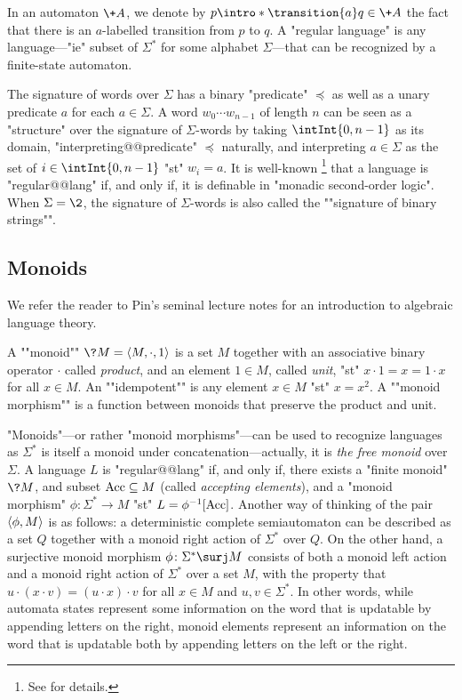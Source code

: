 In an automaton $\+A$, we denote by \AP $p \intro*\transition{a} q \in \+A$
the fact that there is an $a$-labelled transition from $p$ to $q$.
A "regular language" is any language---"ie" subset of $\Sigma^*$ for some alphabet $\Sigma$---that
can be recognized by a finite-state automaton.

The signature of words over $\Sigma$ has a binary "predicate" $\preceq$
as well as a unary predicate $a$ for each $a\in \Sigma$.
A word $w_0 \cdots w_{n-1}$ of length $n$
can be seen as a "structure" over the signature of $\Sigma$-words
by taking $\intInt{0,n-1}$ as its domain, "interpreting@@predicate"
$\preceq$ naturally, and interpreting $a\in \Sigma$
as the set of $i \in \intInt{0,n-1}$ "st" $w_i = a$.
It is well-known%
\footnote{See  for details.}
that a language is "regular@@lang" if, and only if, it is definable in "monadic second-order logic".
When $\Sigma = \2$, the signature of $\Sigma$-words is also called 
the \AP""signature of binary strings"".

\subsection{Monoids}

We refer the reader to Pin's seminal lecture notes \cite{Pin2022MathematicalFoundations}
for an introduction to algebraic language theory.

A \AP""monoid"" $\?M = \tup{M,{\cdot},1}$ is a set $M$ together with an associative binary operator $\cdot$ called \emph{product}, and an element $1 \in M$, called \emph{unit}, "st" $x\cdot 1 = x = 1 \cdot x$ for all $x\in M$. An \AP""idempotent"" is any element $x\in M$ "st" $x = x^2$.
A \AP""monoid morphism"" is a function between monoids that preserve the product and unit.

"Monoids"---or rather "monoid morphisms"---can be used to recognize languages as $\Sigma^*$
is itself a monoid under concatenation---actually, it is \emph{the free monoid} over $\Sigma$.
A language $L$ is "regular@@lang" if, and only if, there exists a "finite monoid" $\?M$,
and subset $\textrm{Acc} \subseteq M$ (called \emph{accepting elements}), and a "monoid morphism"
$\phi\colon \Sigma^* \to M$ "st" $L = \phi^{-1}[\textrm{Acc}]$.
Another way of thinking of the pair $\langle\phi, M\rangle$ is as follows:
a deterministic complete semiautomaton can be described as a set $Q$ together
with a monoid right action of $\Sigma^*$ over $Q$. On the other hand,
a surjective monoid morphism $\phi\colon \Sigma^* \surj M$ consists of both a monoid
left action and a monoid right action of $\Sigma^*$ over a set $M$,
with the property that $u \cdot (x \cdot v) = (u \cdot x) \cdot v$ for all 
$x\in M$ and $u,v \in \Sigma^*$.
In other words, while automata states represent some information on the word
that is updatable by appending letters on the right, monoid elements represent
an information on the word that is updatable both by appending letters on the left or the right. 

